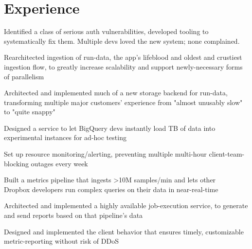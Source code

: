 \documentclass[]{resume}
\begin{document}
\begin{minipage}[t]{0.66\textwidth}




\section{Experience}

\vspace{\topsep} %
\begin{tightemize}
\item Identified a class of serious auth vulnerabilities, developed tooling to systematically fix them. Multiple devs loved the new system; none complained.
\item Rearchitected ingestion of run-data, the app's lifeblood and oldest and crustiest ingestion flow, to greatly increase scalability and support newly-necessary forms of parallelism
\item Architected and implemented much of a new storage backend for run-data, transforming multiple major customers' experience from "almost unusably slow" to "quite snappy"
\end{tightemize}
\sectionsep

\begin{tightemize}
\item Designed a service to let BigQuery devs instantly load TB of data into experimental instances for ad-hoc testing
\item Set up resource monitoring/alerting, preventing multiple multi-hour client-team-blocking outages every week
\end{tightemize}
\sectionsep
    
\begin{tightemize}
\item Built a metrics pipeline that ingests >10M samples/min and lets other \\ Dropbox developers run complex queries on their data in near-real-time
\item Architected and implemented a highly available job-execution service, to generate and send reports based on that pipeline's data
\item Designed and implemented the client behavior that ensures timely, customizable metric-reporting without risk of DDoS
\end{tightemize}
\sectionsep


\end{minipage}
\end{document}
